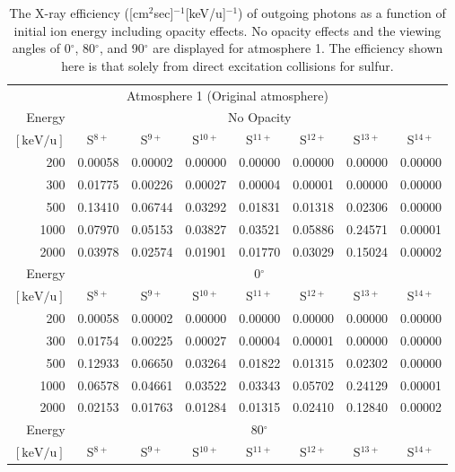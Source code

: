 \begin{table}[ht]
    \centering
    \caption{The X-ray efficiency ([cm$^2$sec]$^{-1}$[keV/u]$^{-1}$) of outgoing photons as a function of initial ion energy including opacity effects. No opacity effects and the viewing angles of 0$^\circ$, 80$^\circ$, and 90$^\circ$ are displayed for atmosphere 1. The efficiency shown here is that solely from direct excitation collisions for sulfur.}
    \begin{tabular}{r|c|c|c|c|c|c|c}
    \multicolumn{8}{c}{Atmosphere 1 (Original atmosphere)} \\ \cline{2-8}
    Energy & \multicolumn{7}{c}{No Opacity} \\ \cline{2-8}
    $\mathrm{[keV/u]}$ & S$^{8+}$ & S$^{9+}$ & S$^{10+}$ & S$^{11+}$ & S$^{12+}$ & S$^{13+}$ & S$^{14+}$ \\ \cline{1-8}
    200   & 0.00058 & 0.00002 & 0.00000 & 0.00000 & 0.00000 & 0.00000 & 0.00000 \\
    300   & 0.01775 & 0.00226 & 0.00027 & 0.00004 & 0.00001 & 0.00000 & 0.00000 \\
    500   & 0.13410 & 0.06744 & 0.03292 & 0.01831 & 0.01318 & 0.02306 & 0.00000 \\
    1000  & 0.07970 & 0.05153 & 0.03827 & 0.03521 & 0.05886 & 0.24571 & 0.00001 \\
    2000  & 0.03978 & 0.02574 & 0.01901 & 0.01770 & 0.03029 & 0.15024 & 0.00002 \\ \cline{1-8}
    Energy & \multicolumn{7}{c}{0$^\circ$} \\ \cline{2-8}
    $\mathrm{[keV/u]}$ & S$^{8+}$ & S$^{9+}$ & S$^{10+}$ & S$^{11+}$ & S$^{12+}$ & S$^{13+}$ & S$^{14+}$ \\ \cline{1-8}
    200   & 0.00058 & 0.00002 & 0.00000 & 0.00000 & 0.00000 & 0.00000 & 0.00000 \\
    300   & 0.01754 & 0.00225 & 0.00027 & 0.00004 & 0.00001 & 0.00000 & 0.00000 \\
    500   & 0.12933 & 0.06650 & 0.03264 & 0.01822 & 0.01315 & 0.02302 & 0.00000 \\
    1000  & 0.06578 & 0.04661 & 0.03522 & 0.03343 & 0.05702 & 0.24129 & 0.00001 \\
    2000  & 0.02153 & 0.01763 & 0.01284 & 0.01315 & 0.02410 & 0.12840 & 0.00002 \\ \cline{1-8}
    Energy & \multicolumn{7}{c}{80$^\circ$} \\ \cline{2-8}
    $\mathrm{[keV/u]}$ & S$^{8+}$ & S$^{9+}$ & S$^{10+}$ & S$^{11+}$ & S$^{12+}$ & S$^{13+}$ & S$^{14+}$ \\ \cline{1-8}

\end{tabular}
\end{table}
